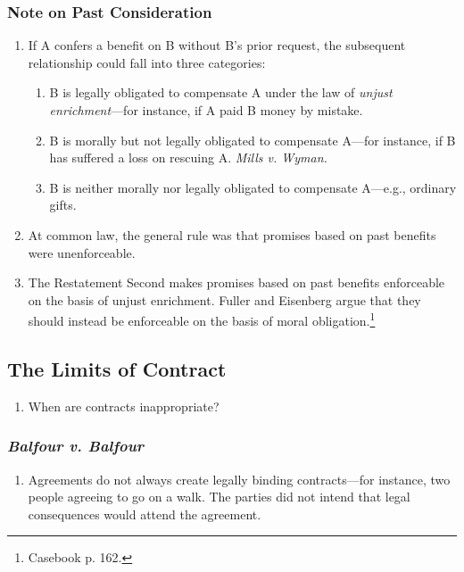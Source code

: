 \subsubsection{Note on Past Consideration}

\begin{enumerate}
    \item If A confers a benefit on B without B's prior request, the 
    subsequent relationship could fall into three categories:
    \begin{enumerate}
        \item B is legally obligated to compensate A under the law of 
        \emph{unjust enrichment}---for instance, if A paid B money by mistake.
        \item B is morally but not legally obligated to compensate A---for 
        instance, if B has suffered a loss on rescuing A. \emph{Mills v. 
        Wyman.}
        \item B is neither morally nor legally obligated to compensate 
        A---e.g., ordinary gifts.
    \end{enumerate}
    \item At common law, the general rule was that promises based on past 
    benefits were unenforceable.
    \item The Restatement Second makes promises based on past benefits 
    enforceable on the basis of unjust enrichment. Fuller and Eisenberg argue 
    that they should instead be enforceable on the basis of moral 
    obligation.\footnote{Casebook p. 162.}
\end{enumerate}

\subsection{The Limits of Contract}

\begin{enumerate}
    \item When are contracts inappropriate?
\end{enumerate}

\subsubsection{\emph{Balfour v. Balfour}}

\begin{enumerate}
    \item Agreements do not always create legally binding contracts---for 
    instance, two people agreeing to go on a walk. The parties did not intend 
    that legal consequences would attend the agreement.
\end{enumerate}

